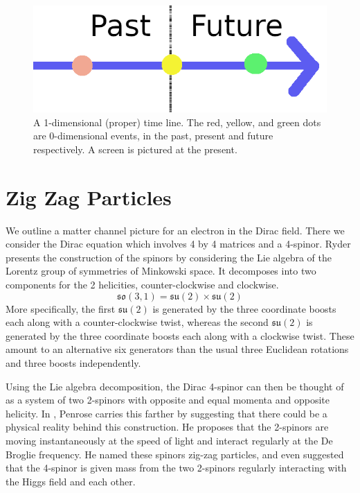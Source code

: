 \documentclass[12pt,a4paper]{article}
\begin{document}
\begin{figure}[H]
\centering
\includegraphics[scale=0.23]{time_line.png}
\caption{A 1-dimensional (proper) time line.  The red, yellow, and green dots are 0-dimensional events, in the past, present and future respectively.  A screen is pictured at the present.}
\label{timeline}
\end{figure}

\section{Zig Zag Particles}
\label{ticktock}
We outline a matter channel picture for an electron in the Dirac field.  There we consider the Dirac equation which involves 4 by 4 matrices and a 4-spinor.  Ryder \cite{ryder} presents the construction of the spinors by considering the Lie algebra of the Lorentz group of symmetries of Minkowski space.  It decomposes into two components for the 2 helicities, counter-clockwise and clockwise.
\[
\mathfrak{so(3,1)} = \mathfrak{su(2)} \times \mathfrak{su(2)}
\]
More specifically, the first $\mathfrak{su(2)}$ is generated by the three coordinate boosts each along with a counter-clockwise twist, whereas the second $\mathfrak{su(2)}$ is generated by the three coordinate boosts each along with a clockwise twist.  These amount to an alternative six generators than the usual three Euclidean rotations and three boosts independently.

Using the Lie algebra decomposition, the Dirac 4-spinor can then be thought of as a system of two 2-spinors with opposite and equal momenta and opposite helicity.  In \cite{penrose}, Penrose carries this farther by suggesting that there could be a physical reality behind this construction.  He proposes that the 2-spinors are moving instantaneously at the speed of light and interact regularly at the De Broglie frequency.  He named these spinors zig-zag particles, and even suggested that the 4-spinor is given mass from the two 2-spinors regularly interacting with the Higgs field and each other.
\end{document}
